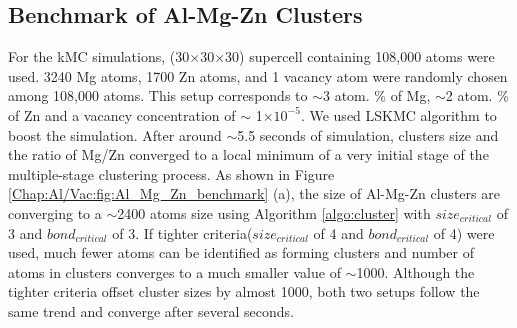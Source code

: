 \subsection{Benchmark of Al-Mg-Zn Clusters}
\label{Chap:Al/Vac:benchmark}
For the \ac{kMC} simulations, (30$\times$30$\times$30) supercell containing 108,000 atoms were used. 3240 Mg atoms, 1700 Zn atoms, and 1 vacancy atom were randomly chosen among 108,000 atoms. This setup corresponds to $\sim$3 atom. \% of Mg, $\sim$2 atom. \% of Zn and a vacancy concentration of $\sim$ 1$\times10^{-5}$. We used \ac{LSKMC} algorithm to boost the simulation. After around $\sim$5.5 seconds of simulation, clusters size and the ratio of Mg/Zn converged to a local minimum of a very initial stage of the multiple-stage clustering process. As shown in Figure \ref{Chap:Al/Vac:fig:Al_Mg_Zn_benchmark} (a), the size of Al-Mg-Zn clusters are converging to a $\sim$2400 atoms size using Algorithm \ref{algo:cluster} with $size_{critical}$ of 3 and $bond_{critical}$ of 3. If tighter criteria($size_{critical}$ of 4 and $bond_{critical}$ of 4) were used, much fewer atoms can be identified as forming clusters and number of atoms in clusters converges to a much smaller value of $\sim$1000. Although the tighter criteria offset cluster sizes by almost 1000, both two setups follow the same trend and converge after several seconds.

